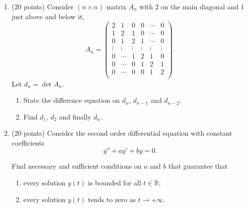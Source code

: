 \documentclass[12pt]{article} %
\theoremstyle{definition} %
\begin{document}
\begin{enumerate}

\newpage

\item (20 points) Consider $(n\times n)$ matrix $A_n$ with $2$ on the main diagonal and $1$ just above and below it,
  \[
  A_n = \begin{pmatrix}
    2 & 1 & 0 & 0 & \cdots & 0 \\
    1 & 2 & 1 & 0 & \cdots & 0 \\
    0 & 1 & 2 & 1 & \cdots & 0 \\
    \vdots & \vdots & \vdots & \vdots & \vdots & \vdots \\
    0 & \cdots & 1 & 2 & 1 & 0 \\
    0 & \cdots & 0 & 1 & 2 & 1 \\
    0 & \cdots & 0 & 0 & 1 & 2 \\
  \end{pmatrix}.
  \]
Let $d_n = \det A_n$. 
\begin{enumerate}
  \item State the difference equation on $d_n$, $d_{n-1}$ and $d_{n-2}$. 
  \item Find $d_1$, $d_2$ and finally $d_n$. 
\end{enumerate}

  
\item (20 points) Consider the second order differential equation with constant coefficients
\[
y''+ay' + by = 0.  
\]    

Find necessary and sufficient conditions on $a$ and $b$ that guarantee that

\begin{enumerate}
  \item every solution $y(t)$ is bounded for all $t\in \mathbb{R}$;
  \item every solution $y(t)$ tends to zero as $t \to +\infty$.
\end{enumerate}

\end{enumerate}
\end{document}
